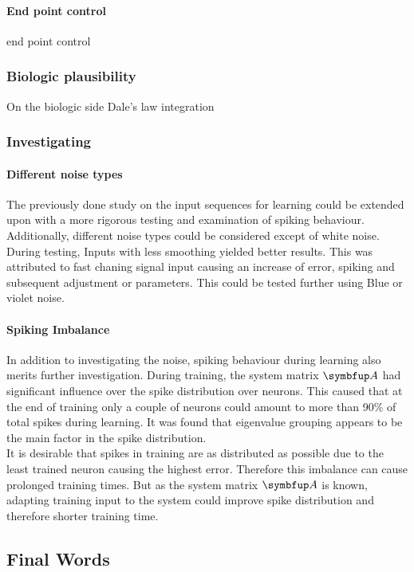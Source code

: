 \paragraph{End point control}
end point control

\subsubsection{Biologic plausibility}
On the biologic side
Dale's law integration
\subsubsection{Investigating}
\paragraph{Different noise types}
The previously done study on the input sequences for learning could be extended upon with a more rigorous testing and examination of spiking behaviour. Additionally, different noise types could be considered except of white noise. During testing, Inputs with less smoothing yielded better results. This was attributed to fast chaning signal input causing an increase of error, spiking and subsequent adjustment or parameters. This could be tested further using Blue or violet noise.
\paragraph{Spiking Imbalance}
In addition to investigating the noise, spiking behaviour during learning also merits further investigation. During training, the system matrix $\bmu{A}$ had significant influence over the spike distribution over neurons. This caused that at the end of training only a couple of neurons could amount to more than 90\% of total spikes during learning. It was found that eigenvalue grouping appears to be the main factor in the spike distribution.\\
It is desirable that spikes in training are as distributed as possible due to the least trained neuron causing the highest error. Therefore this imbalance can cause prolonged training times. But as the system matrix $\bmu{A}$ is known, adapting training input to the system could improve spike distribution and therefore shorter training time.\\
\subsection{Final Words}
\listoftodos



